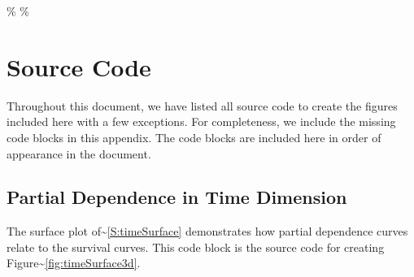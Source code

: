 \documentclass[article]{jss}
\begin{document}
\%\doublespacing
\%\newpage

\appendix
\section{Source Code} Throughout this document, we have listed all
 source code to create the figures included here with a few
exceptions. For completeness, we include the missing code blocks in this
appendix. The code blocks are included here in order of appearance in
the document.

\subsection{Partial Dependence in Time Dimension}\label{A:TimeDomain}

The surface plot of\textasciitilde{}\ref{S:timeSurface} demonstrates how
partial dependence curves relate to the survival curves. This code block
is the  source code for creating
Figure\textasciitilde{}\ref{fig:timeSurface3d}.
\end{document}
